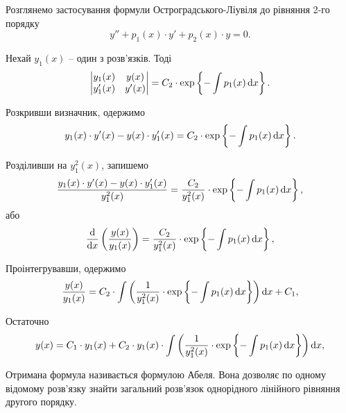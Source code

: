 Розглянемо застосування формули Остроградського-Ліувіля до рівняння 2-го порядку
\begin{equation*}
	y'' + p_1(x) \cdot y' + p_2(x) \cdot y = 0.
\end{equation*}

Нехай $y_1(x)$ -- один з розв’язків. Тоді
\begin{equation*}
	\begin{vmatrix}
		y_1(x) & y(x) \\
		y_1'(x) & y'(x)
	\end{vmatrix} = C_2 \cdot \exp \left\{ - \int p_1(x) \mathop{}\!\mathrm{d} x \right\}.
\end{equation*}

Розкривши визначник, одержимо
\begin{equation*}
	y_1(x) \cdot y'(x) - y(x) \cdot y_1'(x) = C_2 \cdot \exp \left\{ - \int p_1(x) \mathop{}\!\mathrm{d} x \right\}.
\end{equation*}
 
Розділивши на $y_1^2(x)$, запишемо
\begin{equation*}
	\frac{y_1(x) \cdot y'(x) - y(x) \cdot y_1'(x)}{y_1^2(x)} = \frac{C_2}{y_1^2(x)} \cdot \exp \left\{ - \int p_1(x) \mathop{}\!\mathrm{d} x \right\},
\end{equation*}
або
\begin{equation*}
	\frac{\mathop{}\!\mathrm{d}}{\mathop{}\!\mathrm{d} x} \left( \frac{y(x)}{y_1(x)} \right) = \frac{C_2}{y_1^2(x)} \cdot \exp \left\{ - \int p_1(x) \mathop{}\!\mathrm{d} x \right\},
\end{equation*}

Проінтегрувавши, одержимо
\begin{equation*}
	\frac{y(x)}{y_1(x)} = C_2 \cdot \int \left( \frac{1}{y_1^2(x)} \cdot \exp \left\{ - \int p_1(x) \mathop{}\!\mathrm{d} x \right\} \right) \mathop{}\!\mathrm{d} x + C_1,
\end{equation*}

Остаточно
\begin{equation*}
	y(x) = C_1 \cdot y_1(x) + C_2 \cdot y_1(x) \cdot \int \left( \frac{1}{y_1^2(x)} \cdot \exp \left\{ - \int p_1(x) \mathop{}\!\mathrm{d} x \right\} \right) \mathop{}\!\mathrm{d} x,
\end{equation*}

Отримана формула називається формулою Абеля. Вона дозволяє по одному відомому роз\-в'яз\-ку знайти загальний роз\-в'яз\-ок однорідного лінійного рівняння другого порядку.
